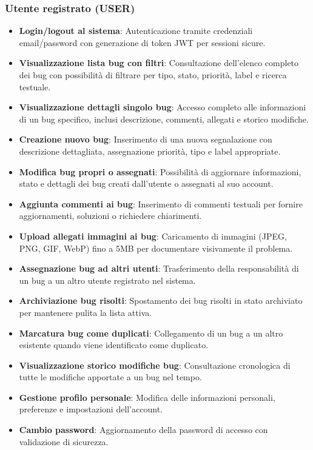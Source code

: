 \subsubsection{Utente registrato (USER)}
\begin{itemize}
    \item \textbf{Login/logout al sistema}: Autenticazione tramite credenziali email/password con generazione di token JWT per sessioni sicure.
    \item \textbf{Visualizzazione lista bug con filtri}: Consultazione dell'elenco completo dei bug con possibilità di filtrare per tipo, stato, priorità, label e ricerca testuale.
    \item \textbf{Visualizzazione dettagli singolo bug}: Accesso completo alle informazioni di un bug specifico, inclusi descrizione, commenti, allegati e storico modifiche.
    \item \textbf{Creazione nuovo bug}: Inserimento di una nuova segnalazione con descrizione dettagliata, assegnazione priorità, tipo e label appropriate.
    \item \textbf{Modifica bug propri o assegnati}: Possibilità di aggiornare informazioni, stato e dettagli dei bug creati dall'utente o assegnati al suo account.
    \item \textbf{Aggiunta commenti ai bug}: Inserimento di commenti testuali per fornire aggiornamenti, soluzioni o richiedere chiarimenti.
    \item \textbf{Upload allegati immagini ai bug}: Caricamento di immagini (JPEG, PNG, GIF, WebP) fino a 5MB per documentare visivamente il problema.
    \item \textbf{Assegnazione bug ad altri utenti}: Trasferimento della responsabilità di un bug a un altro utente registrato nel sistema.
    \item \textbf{Archiviazione bug risolti}: Spostamento dei bug risolti in stato archiviato per mantenere pulita la lista attiva.
    \item \textbf{Marcatura bug come duplicati}: Collegamento di un bug a un altro esistente quando viene identificato come duplicato.
    \item \textbf{Visualizzazione storico modifiche bug}: Consultazione cronologica di tutte le modifiche apportate a un bug nel tempo.
    \item \textbf{Gestione profilo personale}: Modifica delle informazioni personali, preferenze e impostazioni dell'account.
    \item \textbf{Cambio password}: Aggiornamento della password di accesso con validazione di sicurezza.
\end{itemize}

